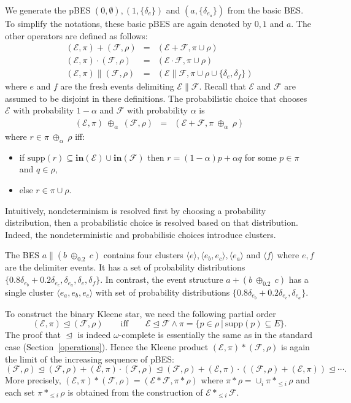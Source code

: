 \documentclass{llncs}
\newcommand{\EE}{\mathcal{E}}
\newcommand{\FF}{\mathcal{F}}
\newcommand{\prefix}{\trianglelefteq}
\newcommand{\init}{\mathbf{in}}
\newcommand{\<}{\langle}
\renewcommand{\>}{\rangle}
\newcommand{\pc}[1]{{\ \oplus_{\!#1}\ }}
\newcommand{\supp}{\mathrm{supp}}
\begin{document}
We generate the pBES $(0,\emptyset),(1,\{\delta_{e}\})$ and $(a,\{\delta_{e_a}\})$ from the basic BES. To simplify the notations, these basic  pBES are again denoted by $0,1$ and $a$. The other operators are defined as follows:
\begin{eqnarray}
(\EE,\pi) + (\FF,\rho) & = & (\EE+\FF,\pi\cup \rho)\nonumber\label{op:nondet}\\
(\EE,\pi)\cdot(\FF,\rho) & = & (\EE\cdot\FF,\pi\cup \rho)\nonumber\label{op:seq}\\
(\EE,\pi)\|(\FF,\rho) & = & (\EE\|\FF,\pi\cup \rho\cup\{\delta_e,\delta_f\})\nonumber\label{op:par}
\end{eqnarray}
where $e$ and $f$ are the fresh events delimiting $\EE\|\FF$. Recall that $\EE$ and $\FF$ are assumed to be disjoint in these definitions. The probabilistic choice that chooses $\EE$ with probability $1-\alpha$ and $\FF$ with probability $\alpha$ is
\begin{eqnarray}
(\EE,\pi)\pc{\alpha}(\FF,\rho) &  = &  (\EE+\FF,\pi\pc{\alpha}\rho)\label{op:pchoice}\nonumber
\end{eqnarray}
where $r\in \pi\pc{\alpha}\rho$ iff:
\begin{itemize}
\item if $\supp(r)\subseteq\init(\EE)\cup\init(\FF)$ then $r = (1-\alpha) p+\alpha q$ for some $p\in\pi$ and $q\in\rho$,
\item else $r\in\pi\cup\rho$.
\end{itemize}

Intuitively, nondeterminism is resolved first by choosing a probability distribution, then a probabilistic choice is resolved based on that distribution. Indeed, the nondeterministic and probabilisic choices introduce clusters.  
\begin{example}
The BES $a\|(b\pc{0.2}c)$ contains four clusters $\<e\>,\<e_b,e_c\>,\<e_a\>$ and $\<f\>$ where $e,f$ are the delimiter events. It has a set of probability distributions $\{0.8\delta_{e_b} + 0.2\delta_{e_c},\delta_{e_a},\delta_e,\delta_f\}$. In contrast, the event structure $a + (b\pc{0.2}c)$ has a single cluster $\<e_a,e_b,e_c\>$ with set of probability distributions $\{0.8\delta_{e_b} + 0.2\delta_{e_c},\delta_{e_a}\}$.
\end{example}

To construct the binary Kleene star, we need the following partial order 
$$(\EE,\pi)\prefix(\FF,\rho)\qquad\textrm{iff}\qquad \EE\prefix\FF\wedge \pi = \{p\in\rho\ |\ \supp(p)\subseteq E\}.$$
The proof that $\prefix$ is indeed $\omega$-complete is essentially the same as in the standard case (Section~\ref{operations}). Hence the Kleene product $(\EE,\pi)*(\FF,\rho)$ is again the limit of the increasing sequence of pBES:
$$(\FF,\rho)\prefix (\FF,\rho) + (\EE,\pi)\cdot(\FF,\rho)\prefix (\FF,\rho)+ (\EE,\pi)\cdot((\FF,\rho) + (\EE,\pi))\prefix\cdots.$$
More precisely, $(\EE,\pi)*(\FF,\rho) = (\EE*\FF,\pi*\rho)$ where $\pi*\rho = \cup_i\pi*_{\le i}\rho$ and each set $\pi*_{\le i}\rho$ is obtained from the construction of $\EE*_{\le i}\FF$.
\end{document}
